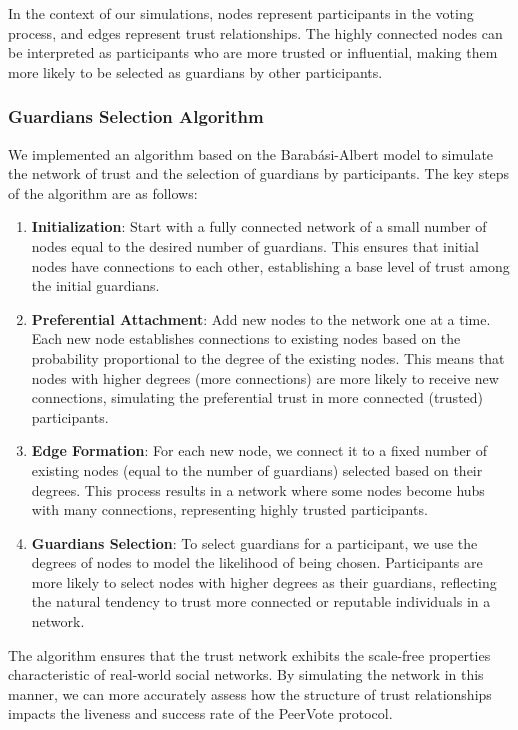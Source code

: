 \documentclass[runningheads]{llncs}
\begin{document}
In the context of our simulations, nodes represent participants in the voting process, and edges represent trust relationships. The highly connected nodes can be interpreted as participants who are more trusted or influential, making them more likely to be selected as guardians by other participants.

\subsubsection{Guardians Selection Algorithm}

We implemented an algorithm based on the Barabási-Albert model to simulate the network of trust and the selection of guardians by participants. The key steps of the algorithm are as follows:

\begin{enumerate} \item \textbf{Initialization}: Start with a fully connected network of a small number of nodes equal to the desired number of guardians. This ensures that initial nodes have connections to each other, establishing a base level of trust among the initial guardians. \item \textbf{Preferential Attachment}: Add new nodes to the network one at a time. Each new node establishes connections to existing nodes based on the probability proportional to the degree of the existing nodes. This means that nodes with higher degrees (more connections) are more likely to receive new connections, simulating the preferential trust in more connected (trusted) participants. \item \textbf{Edge Formation}: For each new node, we connect it to a fixed number of existing nodes (equal to the number of guardians) selected based on their degrees. This process results in a network where some nodes become hubs with many connections, representing highly trusted participants. \item \textbf{Guardians Selection}: To select guardians for a participant, we use the degrees of nodes to model the likelihood of being chosen. Participants are more likely to select nodes with higher degrees as their guardians, reflecting the natural tendency to trust more connected or reputable individuals in a network. \end{enumerate}

The algorithm ensures that the trust network exhibits the scale-free properties characteristic of real-world social networks. By simulating the network in this manner, we can more accurately assess how the structure of trust relationships impacts the liveness and success rate of the PeerVote protocol.
\end{document}
